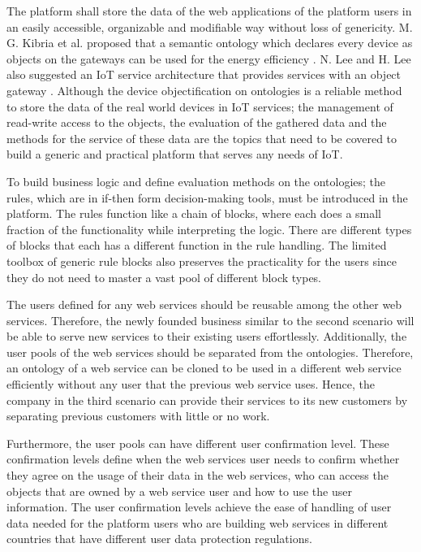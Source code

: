 The platform shall store the data of the web applications of the platform users in an easily accessible, organizable and modifiable way without loss of genericity. M. G. Kibria et al. proposed that a semantic ontology which declares every device as objects on the gateways can be used for the energy efficiency \cite{7993747}. N. Lee and H. Lee also suggested an IoT service architecture that provides services with an object gateway \cite{6884496}. Although the device objectification on ontologies is a reliable method to store the data of the real world devices in IoT services; the management of read-write access to the objects, the evaluation of the gathered data and the methods for the service of these data are the topics that need to be covered to build a generic and practical platform that serves any needs of IoT.

To build business logic and define evaluation methods on the ontologies; the rules, which are in if-then form decision-making tools, must be introduced in the platform. The rules function like a chain of blocks, where each does a small fraction of the functionality while interpreting the logic.  There are different types of blocks that each has a different function in the rule handling. The limited toolbox of generic rule blocks also preserves the practicality for the users since they do not need to master a vast pool of different block types.

The users defined for any web services should be reusable among the other web services. Therefore, the newly founded business similar to the second scenario will be able to serve new services to their existing users effortlessly. Additionally, the user pools of the web services should be separated from the ontologies. Therefore, an ontology of a web service can be cloned to be used in a different web service efficiently without any user that the previous web service uses. Hence, the company in the third scenario can provide their services to its new customers by separating previous customers with little or no work.

Furthermore, the user pools can have different user confirmation level. These confirmation levels define when the web services user needs to confirm whether they agree on the usage of their data in the web services, who can access the objects that are owned by a web service user and how to use the user information. The user confirmation levels achieve the ease of handling of user data needed for the platform users who are building web services in different countries that have different user data protection regulations.

